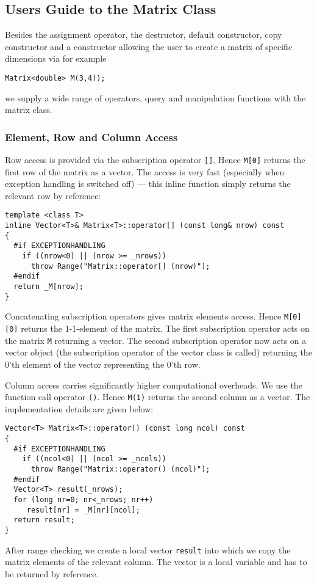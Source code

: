 
\subsection{Users Guide to the Matrix Class}

Besides the assignment operator, the destructor, default constructor,
copy constructor and a constructor allowing the user to create a 
matrix of specific dimensions via for example
{\footnotesize \begin{verbatim}
Matrix<double> M(3,4));
\end{verbatim}}
we supply a wide range of operators, query and manipulation functions 
with the matrix class.


\subsubsection{Element, Row and Column Access}

Row access is provided via the subscription operator \verb+[]+.
Hence \verb+M[0]+ returns the first row of the matrix as a vector.
The access is very fast (especially when exception handling is
switched off) --- this inline function simply returns the relevant row
by reference:
{\footnotesize \begin{verbatim}
template <class T>
inline Vector<T>& Matrix<T>::operator[] (const long& nrow) const
{
  #if EXCEPTIONHANDLING
    if ((nrow<0) || (nrow >= _nrows))
      throw Range("Matrix::operator[] (nrow)");
  #endif
  return _M[nrow];
}
\end{verbatim}}
Concatenating subscription operators gives matrix elements access.
Hence \verb+M[0][0]+ returns the 1-1-element of the matrix. The
first subscription operator acts on the matrix \verb+M+ returning a 
vector. The second subscription operator now acts on a vector object
(the subscription operator of the vector class is called) returning
the 0'th element of the vector representing the 0'th row.

Column access carries significantly higher computational overheads.
We use the function call operator \verb+()+. Hence \verb+M(1)+
returns the second column as a vector. The implementation details
are given below:
{\footnotesize \begin{verbatim}
Vector<T> Matrix<T>::operator() (const long ncol) const
{
  #if EXCEPTIONHANDLING
    if ((ncol<0) || (ncol >= _ncols))
      throw Range("Matrix::operator() (ncol)");
  #endif
  Vector<T> result(_nrows);
  for (long nr=0; nr<_nrows; nr++)
     result[nr] = _M[nr][ncol];
  return result;
}
\end{verbatim}}
After range checking we create a local vector \verb+result+ into which 
we copy the matrix elements of the relevant column. The vector is a local
variable and has to be returned by reference.

